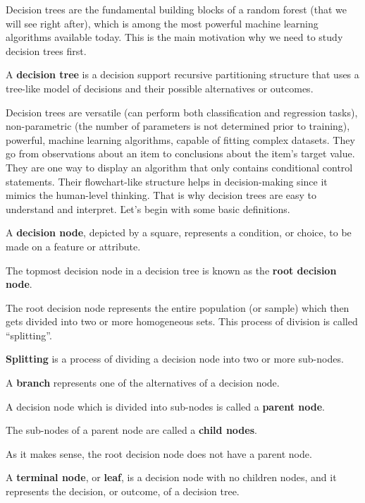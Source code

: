 Decision trees are the fundamental building blocks of a random forest (that we will see right after), which is among
the most powerful machine learning algorithms available today. This is the main motivation why we need to study decision
trees first.

A \textbf{decision tree} is a decision support recursive partitioning structure that uses a tree-like model of
decisions and their possible alternatives or outcomes.
\ed

Decision trees are versatile (can perform both classification and regression tasks), non-parametric (the number of
parameters is not determined prior to training), powerful, machine learning algorithms, capable of fitting complex
datasets. They go from observations about an item to conclusions about the item's target value. They are one way to
display an algorithm that only contains conditional control statements. Their flowchart-like structure helps in
decision-making since it mimics the human-level thinking. That is why decision trees are easy to understand and
interpret. \v

Let's begin with some basic definitions.

A \textbf{decision node}, depicted by a square, represents a condition, or choice, to be made on a feature or attribute.
\ed

The topmost decision node in a decision tree is known as the \textbf{root decision node}.
\ed

The root decision node represents the entire population (or sample) which then gets divided into two or more homogeneous
sets. This process of division is called ``splitting''.

\bd[Splitting]
\textbf{Splitting} is a process of dividing a decision node into two or more sub-nodes.
\ed

\bd [Branch]
A \textbf{branch} represents one of the alternatives of a decision node.
\ed

A decision node which is divided into sub-nodes is called a \textbf{parent node}.
\ed

The sub-nodes of a parent node are called a \textbf{child nodes}.
\ed

As it makes sense, the root decision node does not have a parent node.

A \textbf{terminal node}, or \textbf{leaf}, is a decision node with no children nodes, and it represents the decision,
or outcome, of a decision tree.
\ed

